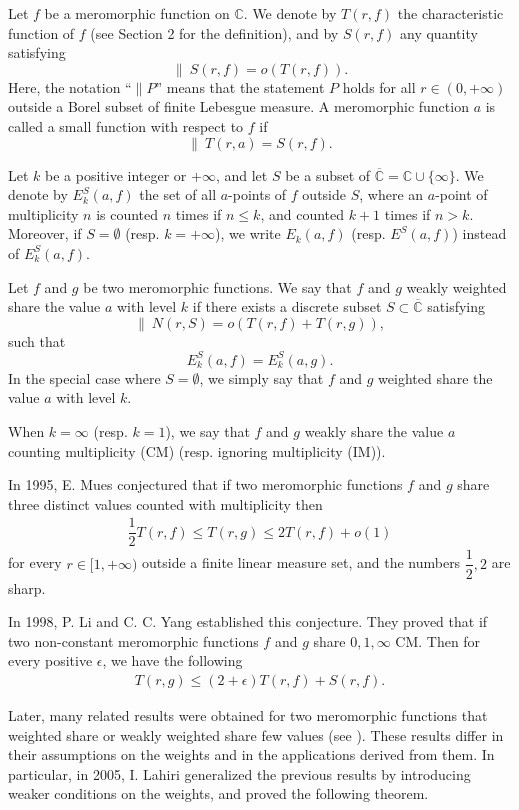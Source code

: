 \documentclass[12pt,leqno]{amsart}
\newcommand{\C}{{\mathbb{C}}}
\numberwithin{equation}{section}
\begin{document}
Let $f$ be a meromorphic function on $\C$. We denote by $T(r,f)$ the characteristic function of $f$ (see Section 2 for the definition), and by $S(r,f)$ any quantity satisfying
$$\|\ S(r,f)=o(T(r,f)).$$
Here, the notation ``$\|P$'' means that the statement $P$ holds for all $r\in(0,+\infty)$ outside a Borel subset of finite Lebesgue measure. A meromorphic function $a$ is called a small function with respect to $f$ if
$$\|\ T(r,a)=S(r,f).$$

Let $k$ be a positive integer or $+\infty$, and let $S$ be a subset of $\overline{\C}=\C\cup\{\infty\}$. We denote by $E_k^S(a,f)$ the set of all $a$-points of $f$ outside $S$, where an $a$-point of multiplicity $n$ is counted $n$ times if $n\le k$, and counted $k+1$ times if $n>k$. Moreover, if $S=\emptyset$ (resp. $k=+\infty$), we write $E_k(a,f)$ (resp. $E^S(a,f)$) instead of $E_k^S(a,f)$.

Let $f$ and $g$ be two meromorphic functions. We say that $f$ and $g$ weakly weighted share the value $a$ with level $k$ if there exists a discrete subset $S\subset\overline{\C}$ satisfying
$$\|\ N(r,S)=o(T(r,f)+T(r,g)),$$
such that
$$E_k^{S}(a,f)=E_k^{S}(a,g).$$
In the special case where $S=\emptyset$, we simply say that $f$ and $g$ weighted share the value $a$ with level $k$.

When $k=\infty$ (resp. $k=1$), we say that $f$ and $g$ weakly share the value $a$ counting multiplicity (CM) (resp. ignoring multiplicity (IM)).

In 1995, E. Mues \cite{EM} conjectured that if two meromorphic functions $f$ and $g$ share three distinct values counted with multiplicity then
\begin{align*}
    \dfrac{1}{2}T(r,f)\le T(r,g)\le 2T(r,f)+o(1)
\end{align*}
for every $r \in [1,+\infty)$ outside a finite linear measure set, and the numbers $\dfrac{1}{2}, 2$ are sharp.

In 1998, P. Li and C. C. Yang \cite{LY3} established this conjecture. They proved that if two non-constant meromorphic functions $f$ and $g$ share $0,1,\infty$ CM. Then for every positive $\epsilon$, we have the following
\begin{align*}
    T(r,g)\le (2+\epsilon)T(r,f) +S(r,f).
\end{align*}

Later, many related results were obtained for two meromorphic functions that weighted share or weakly weighted share few values (see \cite{AY,QH,LY,Y}). These results differ in their assumptions on the weights and in the applications derived from them. In particular, in 2005, I. Lahiri \cite{L} generalized the previous results by introducing weaker conditions on the weights, and proved the following theorem.
\end{document}
